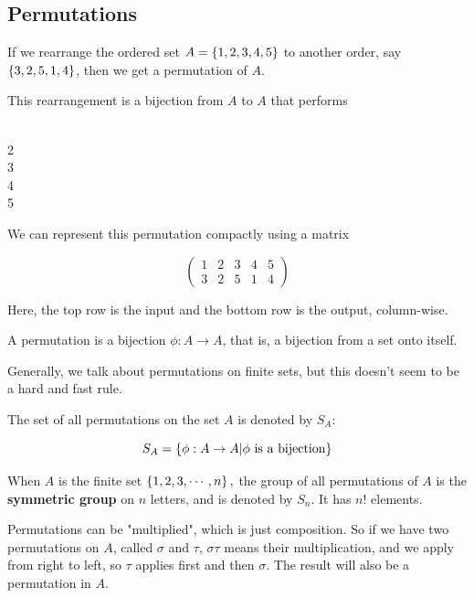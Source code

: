 \documentclass{article}
\begin{document}
\subsection{Permutations}

\begin{example}
If we rearrange the ordered set $A = \left\{ 1,2,3,4,5 \right\}$ to another order, say $\left\{ 3,2,5,1,4 \right\}$, then we get a \@{permutation} of $A$.

This rearrangement is a bijection from $A$ to $A$ that performs

  \\ 2  \\ 3  \\ 4  \\ 5  \eal

We can represent this permutation compactly using a matrix

\[ \begin{pmatrix} 1 & 2 & 3 & 4 & 5 \\ 3 & 2 & 5 & 1 & 4 \end{pmatrix} \]

Here, the top row is the input and the bottom row is the output, column-wise.
\end{example}

\begin{definition}[permutation]
A permutation is a bijection $\phi : A \to A$, that is, a bijection from a set onto itself.
\end{definition}

\begin{note}\label{permutations-usually-finite}
Generally, we talk about \@{permutations} on finite sets, but this doesn't seem to be a hard and fast rule.
\end{note}

The set of all \@{permutations} on the set $A$ is denoted by $S_A$:

\[ S_A = \left\{ \phi : A \to A | \phi \text{ is a bijection} \right\} \]

\begin{definition}
When $A$ is the finite set $\left\{ 1, 2, 3, \cdots, n \right\},$ the \@{group} of all \@{permutations} of $A$ is the \textbf{symmetric group} on $n$ letters, and is denoted by $S_n$. It has $n!$ elements.
\end{definition}

\begin{definition}
\@{Permutations} can be "multiplied", which is just \@{composition}. So if we have two permutations on $A$, called $\sigma$ and $\tau$, $\sigma \tau$ means their multiplication, and we apply from right to left, so $\tau$ applies first and then $\sigma$. The result will also be a permutation in $A$.
\end{definition}
\end{document}
